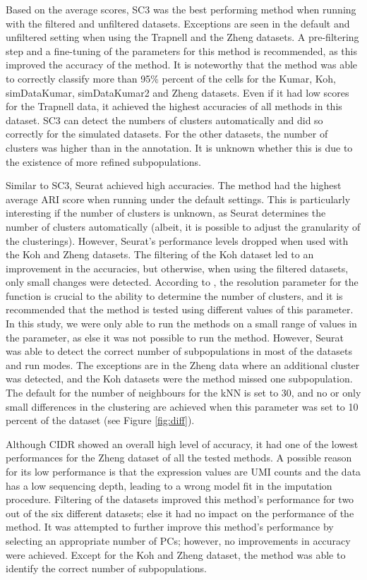 \documentclass[12pt, a4paper]{article}\usepackage[]{graphicx}\usepackage[]{color}
\begin{document}
Based on the average scores, SC3 was the best performing method when running with the filtered and unfiltered datasets. Exceptions are seen in the default and unfiltered setting when using the Trapnell and the Zheng datasets. A pre-filtering step and a fine-tuning of the parameters for this method is recommended, as this improved the accuracy of the method. It is noteworthy that the method was able to correctly classify more than 95\% percent of the cells for the Kumar, Koh, simDataKumar, simDataKumar2 and Zheng datasets. Even if it had low scores for the Trapnell data, it achieved the highest accuracies of all methods in this dataset. SC3 can detect the numbers of clusters automatically and did so correctly for the simulated datasets. For the other datasets, the number of clusters was higher than in the annotation. It is unknown whether this is due to the existence of more refined subpopulations. 

Similar to SC3, Seurat achieved high accuracies. The method had the highest average ARI score when running under the default settings. This is particularly interesting if the number of clusters is unknown, as Seurat determines the number of clusters automatically (albeit, it is possible to adjust the granularity of the clusterings). However, Seurat’s performance levels dropped when used with the Koh and Zheng datasets. The filtering of the Koh dataset led to an improvement in the accuracies, but otherwise, when using the filtered datasets, only small changes were detected. According to \citet{butler2017integrated}, the resolution parameter for the function is crucial to the ability to determine the number of clusters, and it is recommended that the method is tested using different values of this parameter. In this study, we were only able to run the methods on a small range of values in the parameter, as else it was not possible to run the method. However, Seurat was able to detect the correct number of subpopulations in most of the datasets and run modes. The exceptions are in the Zheng data where an additional cluster was detected, and the Koh datasets were the method missed one subpopulation. The default for the number of neighbours for the kNN is set to 30, and no or only small differences in the clustering are achieved when this parameter was set to 10 percent of the dataset (see Figure \ref{fig:diff}). 

Although CIDR showed an overall high level of accuracy, it had one of the lowest performances for the Zheng dataset of all the tested methods. A possible reason for its low performance is that the expression values are UMI counts and the data has a low sequencing depth, leading to a wrong model fit in the imputation procedure. Filtering of the datasets improved this method’s performance for two out of the six different datasets; else it had no impact on the performance of the method. It was attempted to further improve this method’s performance by selecting an appropriate number of PCs; however, no improvements in accuracy were achieved. Except for the Koh and Zheng dataset, the method was able to identify the correct number of subpopulations.
\end{document}
